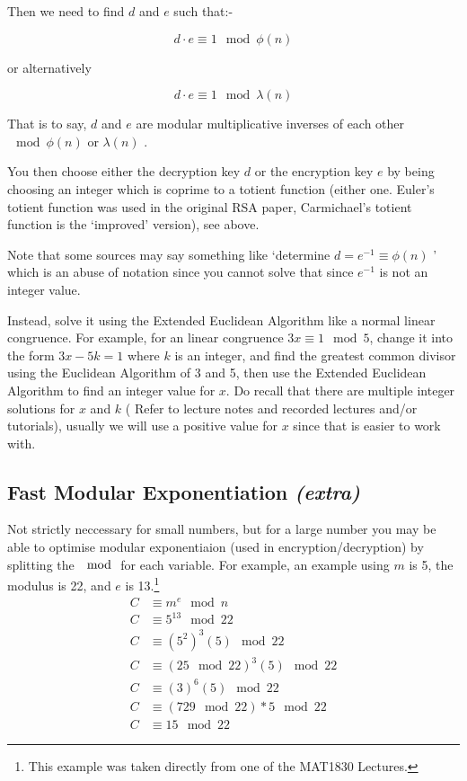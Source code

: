 \documentclass[twocolumn, a4paper,12pt]{article}
\let\modcong\equiv
\begin{document}
Then we need to find $d$ and $e$ such that:-

\[ d \cdot e \modcong 1 \mod \phi (n) \]

or alternatively

\[ d \cdot e \modcong 1 \mod \lambda (n) \]

That is to say, $d$ and $e$ are modular multiplicative inverses of each other 
$\mod \phi (n)$ or $\lambda (n)$ .

You then choose either the decryption key $d$ or the encryption key $e$ by being choosing 
an integer which is coprime to a totient function (either one. Euler's totient function was
used in the original RSA paper, Carmichael's totient function is the `improved' version), 
see above.


Note that some sources may say something like `determine $d = e^{-1} \modcong \phi (n) $ ' which
is an abuse of notation since you cannot solve that since $e^{-1}$ is not an integer value. 

Instead, solve it using the Extended Euclidean Algorithm like a 
normal linear congruence. For example, for an linear congruence 
$3x \modcong 1 \mod 5$, change it into the form $3x - 5k = 1$ where 
$k$ is an integer, and find the greatest common divisor using 
the Euclidean Algorithm of 3 and 5, then use the Extended 
Euclidean Algorithm to find an integer value
for $x$. Do recall that there are multiple integer solutions for $x$ and $k$ (
Refer to lecture notes and recorded lectures and/or tutorials), usually we will use
a positive value for $x$ since that is easier to work with.

\subsection{Fast Modular Exponentiation {\em (extra)}}
Not strictly neccessary for small numbers, but for a large number
you may be able to optimise modular exponentiaion (used in encryption/decryption) 
by splitting the $\mod$ for each variable. For example,
an example using $m$ is 5, the modulus is 22, and $e$ is 13.\footnote{
This example was taken directly from one of the MAT1830 Lectures.}
\begin{equation*}
\begin{split}
 C & \modcong m^e \mod n \\
 C & \modcong 5^{13} \mod 22 \\
 C & \modcong {(5^2)}^3 (5) \mod 22 \\
 C & \modcong {(25 \mod 22)}^3 (5) \mod 22 \\
 C & \modcong {(3)}^6 (5) \mod 22 \\
 C & \modcong (729 \mod 22) * {5 \mod 22} \\
 C & \modcong 15 \mod 22
\end{split}
\end{equation*}
\end{document}
